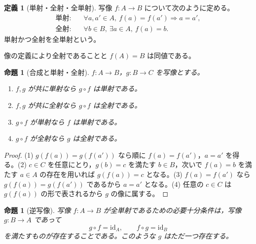 \documentclass[a5paper,10pt,dvipdfmx]{jsarticle}
\theoremstyle{definition}
\newtheorem{defn}[ruledef]{定義}
\theoremstyle{plain}
\newtheorem{prop}[ruledef]{命題}
\newcommand{\impc}{\Longrightarrow}
\newcommand{\id}{\mathrm{id}}
\begin{document}
\begin{defn}[単射・全射・全単射]\label{k39}
写像 $f:A\to B$ について次のように定める。
\begin{align*}
 \text{単射}:&\quad\forall a,a'\in A,\ f(a)=f(a')\impc a=a',\\
 \text{全射}:&\quad\forall b\in B,\ \exists a\in A,\ f(a)=b.
\end{align*}
単射かつ全射を全単射という。
\end{defn}
像の定義により全射であることと $f(A)=B$ は同値である。
\begin{prop}[合成と単射・全射]\label{k40}
$f:A\to B$，$g:B\to C$ を写像とする。
\begin{enumerate}
\item $f,g$ が共に単射なら $g\circ f$ は単射である。
\item $f,g$ が共に全射なら $g\circ f$ は全射である。
\item $g\circ f$ が単射なら $f$ は単射である。
\item $g\circ f$ が全射なら $g$ は全射である。
\end{enumerate}
\end{prop}
\begin{proof}
(1) $g(f(a))=g(f(a'))$ なら順に $f(a)=f(a')$，$a=a'$ を得る。(2) $c\in C$ を任意にとり，$g(b)=c$ を満たす $b\in B$，次いで $f(a)=b$ を満たす $a\in A$ の存在を用いれば $g(f(a))=c$ となる。(3) $f(a)=f(a')$ なら $g(f(a))=g(f(a'))$ であるから $a=a'$ となる。(4) 任意の $c\in C$ は $g(f(a))$ の形で表されるから $g$ の像に属する。
\end{proof}
\begin{prop}[逆写像]\label{k41}
写像 $f:A\to B$ が全単射であるための必要十分条件は，写像 $g:B\to A$ であって
\[
 g\circ f=\id_A,\qquad f\circ g=\id_B
\]
を満たすものが存在することである。このような $g$ はただ一つ存在する。
\end{prop}
\end{document}
